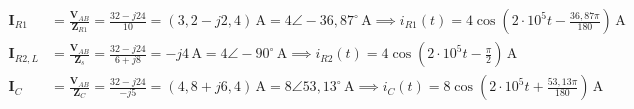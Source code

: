 \begin{ejercicio}
\begin{enumerate}
    \begin{align*}
        \mathbf{I}_{R1} &= \frac{\mathbf{V}_{AB}}{\mathbf{Z}_{R1}} = \frac{32 - j 24}{10} = (3{,}2 - j 2{,}4)\,\si{\ampere} = 4\angle -36{,}87^\circ\,\si{\ampere} \implies \boxed{i_{R1}(t) = 4\cos\left(2\cdot 10^5 t - \frac{36{,}87\pi}{180}\right)\,\si{\ampere}} \\
        \mathbf{I}_{R2,L} &= \frac{\mathbf{V}_{AB}}{\mathbf{Z}_s} = \frac{32 - j 24}{6 + j 8} = -j 4\,\si{\ampere} = 4\angle -90^\circ\,\si{\ampere} \implies \boxed{i_{R2}(t) = 4\cos\left(2\cdot 10^5 t - \frac{\pi}{2}\right)\,\si{\ampere}} \\
        \mathbf{I}_C &= \frac{\mathbf{V}_{AB}}{\mathbf{Z}_C} = \frac{32 - j 24}{-j 5} = (4{,}8 + j 6{,}4)\,\si{\ampere} = 8\angle 53{,}13^\circ\,\si{\ampere} \implies \boxed{i_C(t) = 8\cos\left(2\cdot 10^5 t + \frac{53{,}13\pi}{180}\right)\,\si{\ampere}}
    \end{align*}
\end{enumerate}
\end{ejercicio}

